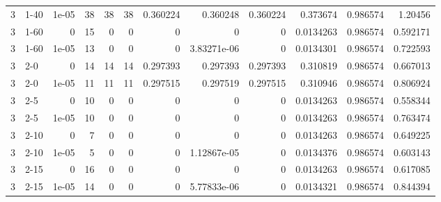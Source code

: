 \begin{tabular}{rlrrrrrrrrrr}
     3 & 1-40   &      1e-05 &          38 &                38 &                38 &     0.360224    &     0.360248    &      0.360224    &        0.373674  &               0.986574 &           1.20456  \\
     3 & 1-60   &      0     &          15 &                 0 &                 0 &     0           &     0           &      0           &        0.0134263 &               0.986574 &           0.592171 \\
     3 & 1-60   &      1e-05 &          13 &                 0 &                 0 &     0           &     3.83271e-06 &      0           &        0.0134301 &               0.986574 &           0.722593 \\
     3 & 2-0    &      0     &          14 &                14 &                14 &     0.297393    &     0.297393    &      0.297393    &        0.310819  &               0.986574 &           0.667013 \\
     3 & 2-0    &      1e-05 &          11 &                11 &                11 &     0.297515    &     0.297519    &      0.297515    &        0.310946  &               0.986574 &           0.806924 \\
     3 & 2-5    &      0     &          10 &                 0 &                 0 &     0           &     0           &      0           &        0.0134263 &               0.986574 &           0.558344 \\
     3 & 2-5    &      1e-05 &          10 &                 0 &                 0 &     0           &     0           &      0           &        0.0134263 &               0.986574 &           0.763474 \\
     3 & 2-10   &      0     &           7 &                 0 &                 0 &     0           &     0           &      0           &        0.0134263 &               0.986574 &           0.649225 \\
     3 & 2-10   &      1e-05 &           5 &                 0 &                 0 &     0           &     1.12867e-05 &      0           &        0.0134376 &               0.986574 &           0.603143 \\
     3 & 2-15   &      0     &          16 &                 0 &                 0 &     0           &     0           &      0           &        0.0134263 &               0.986574 &           0.617085 \\
     3 & 2-15   &      1e-05 &          14 &                 0 &                 0 &     0           &     5.77833e-06 &      0           &        0.0134321 &               0.986574 &           0.844394 \\

\end{tabular}
